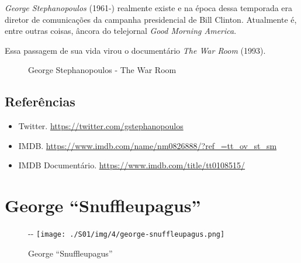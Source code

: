 \emph{George Stephanopoulos} (1961-) realmente existe e na época dessa
temporada era diretor de comunicações da campanha presidencial de Bill
Clinton. Atualmente é, entre outras coisas, âncora do telejornal
\emph{Good Morning America}.

Essa passagem de sua vida virou o documentário \emph{The War Room}
(1993).

\begin{figure}
  \centering
    \caption{George Stephanopoulos - The War Room\label{fig:george-stephanopoulos-the-war-room}}
\end{figure}

\hypertarget{referuxeancias-3}{%
\subsection{Referências}\label{referuxeancias-3}}

\begin{itemize}
\tightlist
\item
  \sloppy Twitter. \url{https://twitter.com/gstephanopoulos}
\item
  \sloppy IMDB. \url{https://www.imdb.com/name/nm0826888/?ref_=tt_ov_st_sm}
\item
  \sloppy IMDB Documentário. \url{https://www.imdb.com/title/tt0108515/}
\end{itemize}

\hypertarget{george-snuffleupagus}{%
\section{George ``Snuffleupagus''}\label{george-snuffleupagus}}

\begin{figure}[!ht]
  \begin{adjustwidth}{-\oddsidemargin-1in}{-\rightmargin}
    \centering
    \texttt{[image: ./S01/img/4/george-snuffleupagus.png]}
    \caption{George ``Snuffleupagus''\label{fig:george-snuffleupagus}}
  \end{adjustwidth}
\end{figure}

